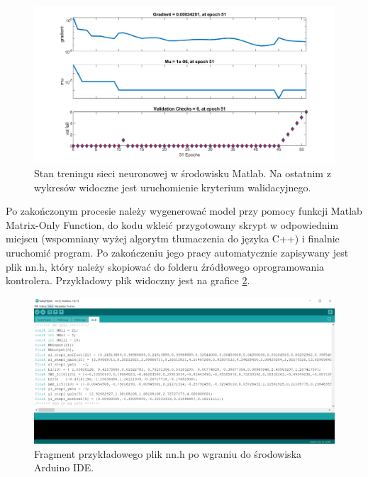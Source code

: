 \documentclass[12pt, a4paper]{article}
\begin{document}
 \begin{figure}[H]
    \centering
    \includegraphics[width=1\textwidth]{training_state}
    \caption{Stan treningu sieci neuronowej w środowisku Matlab. Na ostatnim z wykresów widoczne jest uruchomienie kryterium walidacyjnego.}
    \label{fig:matwyk}
\end{figure}

Po zakończonym procesie należy wygenerować model przy pomocy funkcji Matlab Matrix-Only Function, do kodu wkleić przygotowany skrypt w odpowiednim miejscu (wspomniany wyżej algorytm tłumaczenia do języka C++) i finalnie uruchomić program. Po zakończeniu jego pracy automatycznie zapisywany jest plik nn.h, który należy skopiować do folderu źródłowego oprogramowania kontrolera. Przykładowy plik widoczny jest na grafice \ref{fig:nn}.

 \begin{figure}[ht]
    \centering
    \includegraphics[width=1\textwidth]{nnh}
    \caption{Fragment przykładowego plik nn.h po wgraniu do środowiska Arduino IDE.}
    \label{fig:nn}
\end{figure}

\FloatBarrier
\end{document}
